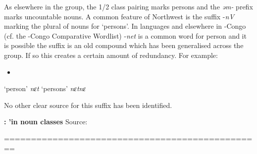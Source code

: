 \documentclass[output=paper]{langsci/langscibook}
\begin{document}
As elsewhere in the group, the 1/2 class pairing marks persons and the \textit{əm-} prefix marks uncountable nouns. A common feature of Northwest  is the suffix -\textit{nV} marking the plural of nouns for ‘persons’. In  languages and elsewhere in -Congo (cf. the -Congo Comparative Wordlist) -\textit{net} is a common word for person and it is possible the suffix is an old compound which has been generalised across the group. If so this creates a certain amount of redundancy. For example:

\begin{itemize}
\item \ea\label{ex:key:}
\\
\end{itemize}

    ‘person’ \textit{nɛt}    ‘persons’  \textit{nɛtnɛ}

No other clear source for this suffix has been identified.

\textbf{: ’in noun classes} Source: \citet{Paterson2012}

  ================================================
\end{document}
